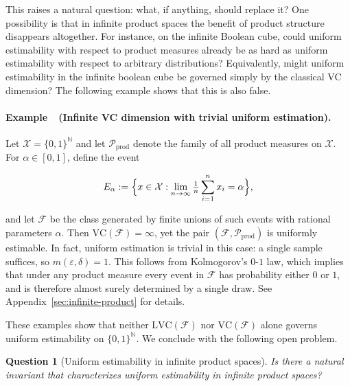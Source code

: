 \documentclass[arxiv]{colt2026}
\newtheorem{question}[theorem]{Question}
\newcounter{examplectr}
\newcommand{\X}{\mathcal{X}}
\newcommand{\F}{\mathcal{F}}
\newcommand{\Pc}{\mathcal{P}}
\newcommand{\VC}{\mathrm{VC}}
\newcommand{\LVC}{\mathrm{LVC}}
\begin{document}
This raises a natural question: what, if anything, should replace it?
One possibility is that in infinite product spaces the benefit of product
structure disappears altogether.
For instance, on the infinite Boolean cube, could uniform estimability with
respect to product measures already be as hard as uniform estimability with
respect to arbitrary distributions?
Equivalently, might uniform estimability in the infinite boolean cube be governed simply by
the classical VC dimension?
The following example shows that this is also false.
\paragraph{Example~\theexamplectr\ (Infinite VC dimension with trivial uniform estimation).}
\label{ex:tail-trivial}
Let $\X=\{0,1\}^{\mathbb N}$ and let $\Pc_{\mathrm{prod}}$ denote the family of all
product measures on $\X$.
For $\alpha\in[0,1]$, define the event

\vspace{-0.5em}
\[
E_\alpha
:=
\Bigl\{
  x\in\X :
  \lim_{n\to\infty}\tfrac{1}{n}\sum_{i=1}^n x_i = \alpha
\Bigr\},
\]

\vspace{-0.3em}
and let $\F$ be the class generated by finite unions of such events with rational
parameters $\alpha$.
Then $\VC(\F)=\infty$, yet the pair $(\F,\Pc_{\mathrm{prod}})$ is uniformly
estimable.
In fact, uniform estimation is trivial in this case: a single sample suffices,
so $m(\varepsilon,\delta)=1$.
This follows from Kolmogorov’s $0$-$1$ law, which implies that under any product
measure every event in $\F$ has probability either $0$ or $1$, and is therefore
almost surely determined by a single draw. See Appendix~\ref{sec:infinite-product} for details.


\smallskip

These examples show that neither $\LVC(\F)$ nor $\VC(\F)$ alone governs uniform estimability on $\{0,1\}^{\mathbb N}$. We conclude with the following open problem.

\vspace{-0.4em}
\begin{question}[Uniform estimability in infinite product spaces]
\label{q:infinite}
Is there a natural invariant that characterizes uniform estimability in infinite
product spaces?
\end{question}




\vspace{-2em}
\end{document}
